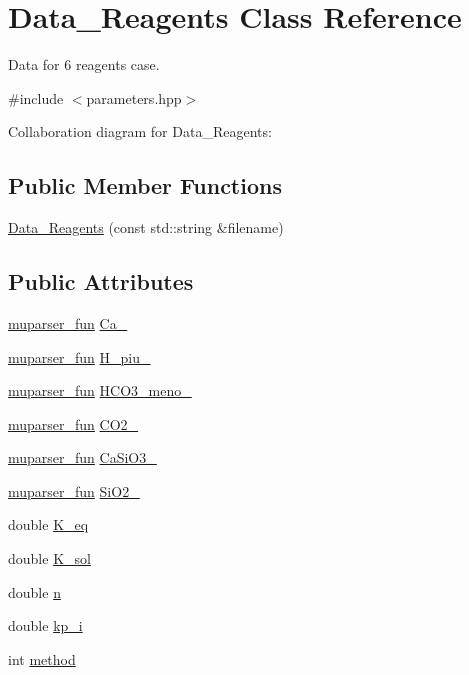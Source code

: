 \hypertarget{classData__6Reagents}{}\section{Data\+\_\+Reagents Class Reference}
\label{classData__6Reagents}


Data for 6 reagents case.  




{\ttfamily \#include $<$parameters.\+hpp$>$}



Collaboration diagram for Data\+\_\+Reagents\+:
\subsection*{Public Member Functions}
\begin{DoxyCompactItemize}
\item 
\hyperlink{classData__6Reagents_a5a222af278c0506507fd868cbb8f4c55}{Data\+\_\+Reagents} (const std\+::string \&filename)
\end{DoxyCompactItemize}
\subsection*{Public Attributes}
\begin{DoxyCompactItemize}
\item 
\hyperlink{classmuparser__fun}{muparser\+\_\+fun} \hyperlink{classData__6Reagents_ac22e837369542165f3e3aa81022e6757}{Ca\+\_}
\item 
\hyperlink{classmuparser__fun}{muparser\+\_\+fun} \hyperlink{classData__6Reagents_ae814d66d022c472e6f5981cd95dadb35}{H\+\_\+piu\+\_}
\item 
\hyperlink{classmuparser__fun}{muparser\+\_\+fun} \hyperlink{classData__6Reagents_af7198c0804df5079215195c64ce526e4}{H\+C\+O3\+\_\+meno\+\_}
\item 
\hyperlink{classmuparser__fun}{muparser\+\_\+fun} \hyperlink{classData__6Reagents_a71cae6dc150a3ce8c8d11a0e7d8f06d4}{C\+O2\+\_}
\item 
\hyperlink{classmuparser__fun}{muparser\+\_\+fun} \hyperlink{classData__6Reagents_a3dfd54ceaf5be9ed6aed54997df5d85a}{Ca\+Si\+O3\+\_}
\item 
\hyperlink{classmuparser__fun}{muparser\+\_\+fun} \hyperlink{classData__6Reagents_a4bd4a6b52f5fec8657d3e41a45509830}{Si\+O2\+\_}
\item 
double \hyperlink{classData__6Reagents_a61e053aeaa44fdd78d2920aecbb00bc3}{K\+\_\+eq}
\item 
double \hyperlink{classData__6Reagents_aaee61cbe4ee44469840bc4a1e14a6338}{K\+\_\+sol}
\item 
double \hyperlink{classData__6Reagents_ab4e2397757b2d8d4c6c7871fe73d5f8d}{n}
\item 
double \hyperlink{classData__6Reagents_a94c3d204c92cc4d378dec4c6cd4a2a75}{kp\+\_\+i}
\item 
int \hyperlink{classData__6Reagents_a00d5e8859abed221a66d1c13c21cb199}{method}
\end{DoxyCompactItemize}


